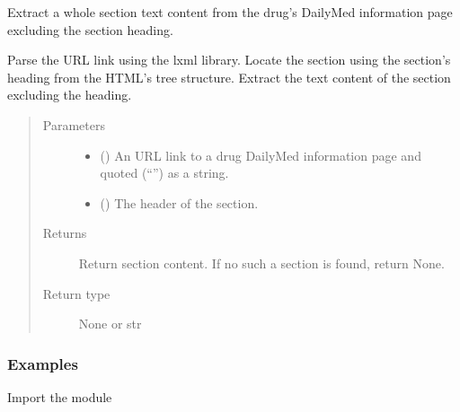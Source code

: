 \documentclass[letterpaper,10pt,english]{sphinxmanual}
\begin{document}

\begin{fulllineitems}
\label{\detokenize{biomarker_extraction:biomarker_extraction.section_content}}
\sphinxAtStartPar
Extract a whole section text content from the drug’s DailyMed information page excluding the section heading.

\sphinxAtStartPar
Parse the URL link using the lxml library. Locate the section using the section’s heading from the HTML’s tree structure. Extract the text content of the section excluding the heading.
\begin{quote}\begin{description}
\item[{Parameters}] \leavevmode\begin{itemize}
\item {} 
\sphinxAtStartPar
{} () \textendash{} An URL link to a drug DailyMed information page and quoted (“”) as a string.

\item {} 
\sphinxAtStartPar
{} () \textendash{} The header of the section.

\end{itemize}

\item[{Returns}] \leavevmode
\sphinxAtStartPar
Return section content. If no such a section is found, return None.

\item[{Return type}] \leavevmode
\sphinxAtStartPar
None or str

\end{description}\end{quote}
\subsubsection*{Examples}

\sphinxAtStartPar
Import the module

\begin{sphinxVerbatim}[commandchars=\\\{\}]
   
\end{sphinxVerbatim}


\end{fulllineitems}
\end{document}
